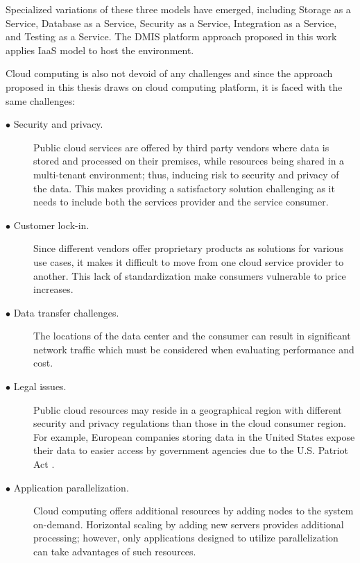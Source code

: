 Specialized variations of these three models have emerged, including Storage as a Service, Database as a Service, Security as a Service, Integration as a Service, and Testing as a Service. The DMIS platform approach proposed in this work applies IaaS model to host the environment.

Cloud computing is also not devoid of any challenges and since the approach proposed in this thesis draws on cloud computing platform, it is faced with the same challenges:

\begin{description}
	\item[$\bullet$ Security and privacy.]
	\hfill\break
	Public cloud services are offered by third party vendors where data is stored and processed on their premises, while resources being shared in a multi-tenant environment; thus, inducing risk to security and privacy of the data. This makes providing a satisfactory solution challenging as it needs to include both the services provider and the service consumer.
	
	\item[$\bullet$ Customer lock-in.]
	\hfill\break
	Since different vendors offer proprietary products as solutions for various use cases, it makes it difficult to move from one cloud service provider to another. This lack of standardization make consumers vulnerable to price increases. 
	
	\item[$\bullet$ Data transfer challenges.]
	\hfill\break
	The locations of the data center and the consumer can result in significant network traffic which must be considered when evaluating performance and cost. 
	
	\item[$\bullet$ Legal issues.]
	\hfill\break
	Public cloud resources may reside in a geographical region with different security and privacy regulations than those in the cloud consumer region. For  example,  European  companies  storing  data  in  the  United  States  expose  their data to easier access by government agencies due to the U.S. Patriot Act \cite{erl2013cloud}.
	
	\item[$\bullet$ Application parallelization.]
	\hfill\break
	Cloud computing offers additional resources by adding nodes to the system on-demand. Horizontal scaling by adding new servers provides additional processing; however, only applications designed to utilize parallelization can take advantages of such resources.
\end{description}

